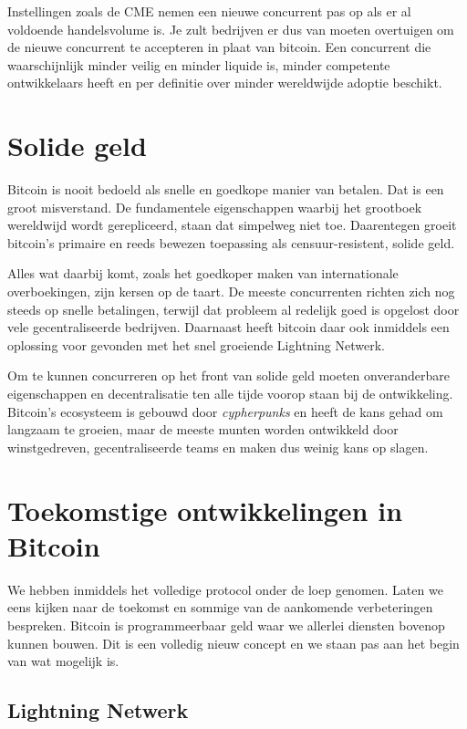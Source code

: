 Instellingen zoals de CME nemen een nieuwe concurrent pas op als er al voldoende handelsvolume is. Je zult bedrijven er dus van moeten overtuigen om de nieuwe concurrent te accepteren in plaat van bitcoin. Een concurrent die waarschijnlijk minder veilig en minder liquide is, minder competente ontwikkelaars heeft en per definitie over minder wereldwijde adoptie beschikt. 

\section{Solide geld}

Bitcoin is nooit bedoeld als snelle en goedkope manier van betalen. Dat is een groot misverstand. De fundamentele eigenschappen waarbij het grootboek wereldwijd wordt gerepliceerd, staan dat simpelweg niet toe. Daarentegen groeit bitcoin's primaire en reeds bewezen toepassing als censuur-resistent, solide geld. 

Alles wat daarbij komt, zoals het goedkoper maken van internationale overboekingen, zijn kersen op de taart. De meeste concurrenten richten zich nog steeds op snelle betalingen, terwijl dat probleem al redelijk goed is opgelost door vele gecentraliseerde bedrijven. Daarnaast heeft bitcoin daar ook inmiddels een oplossing voor gevonden met het snel groeiende Lightning Netwerk. 

Om te kunnen concurreren op het front van solide geld moeten onveranderbare eigenschappen en decentralisatie ten alle tijde voorop staan bij de ontwikkeling. Bitcoin's ecosysteem is gebouwd door \textit{cypherpunks} en heeft de kans gehad om langzaam te groeien, maar de meeste munten worden ontwikkeld door winstgedreven, gecentraliseerde teams en maken dus weinig kans op slagen.   

\section{Toekomstige ontwikkelingen in Bitcoin}

We hebben inmiddels het volledige protocol onder de loep genomen. Laten we eens kijken naar de toekomst en sommige van de aankomende verbeteringen bespreken. Bitcoin is programmeerbaar geld waar we allerlei diensten bovenop kunnen bouwen. Dit is een volledig nieuw concept en we staan pas aan het begin van wat mogelijk is.

\subsection{Lightning Netwerk}

